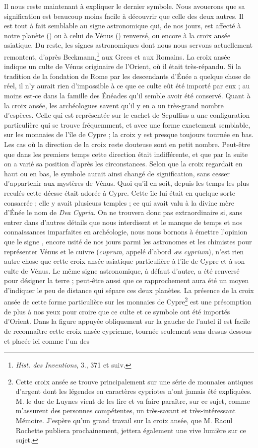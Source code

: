 \documentclass[a4paper, 11pt, oneside, polutonikogreek, french]{article}
\begin{document}
Il nous reste maintenant à expliquer le dernier symbole. Nous avouerons que sa signification est beaucoup moins facile à découvrir que celle des deux autres. Il est tout à fait semblable au signe astronomique qui, de nos jours, est affecté à notre planète (\earth) ou à celui de Vénus (\venus) renversé, ou encore à la croix ansée asiatique. Du reste, les signes astronomiques dont nous nous servons actuellement remontent, d'après Beckmann,\footnote{\emph{Hist. des Inventions}, 3., 371 et suiv.} aux Grecs et aux Romains. La croix ansée indique un culte de Vénus originaire de l'Orient, où il était très-répandu. Si la tradition de la fondation de Rome par les descendants d'Énée a quelque chose de réel, il n'y aurait rien d'impossible à ce que ce culte eût été importé par eux ; au moins est-ce dans la famille des Énéades qu'il semble avoir été conservé. Quant à la croix ansée, les archéologues savent qu'il y en a un très-grand nombre d'espèces. Celle qui est représentée sur le cachet de Sepullius a une configuration particulière qui se trouve fréquemment, et avec une forme exactement semblable, sur les monnaies de l'île de Cypre ; la croix y est presque toujours tournée en bas. Les cas où la direction de la croix reste douteuse sont en petit nombre. Peut-être que dans les premiers temps cette direction était indifférente, et que par la suite on a varié sa position d'après les circonstances. Selon que la croix regardait en haut ou en bas, le symbole aurait ainsi changé de signification, sans cesser d'appartenir aux mystères de Vénus. Quoi qu'il en soit, depuis les temps les plus reculés cette déesse était adorée à Cypre. Cette île lui était en quelque sorte consacrée ; elle y avait plusieurs temples ; ce qui avait valu à la divine mère d'Énée le nom de \emph{Dea Cypria}. On ne trouvera donc pas extraordinaire si, sans entrer dans d'autres détails que nous interdisent et le manque de temps et nos connaissances imparfaites en archéologie, nous nous bornons à émettre l'opinion que le signe \venus, encore usité de nos jours parmi les astronomes et les chimistes pour représenter Vénus et le cuivre (\emph{cuprum}, appelé d'abord \emph{æs cyprium}), n'est rien autre chose que cette croix ansée asiatique particulière à l'île de Cypre et à son culte de Vénus. Le même signe astronomique, à défaut d'autre, a été renversé pour désigner la terre ; peut-être aussi que ce rapprochement aura été un moyen d'indiquer le peu de distance qui sépare ces deux planètes. La présence de la croix ansée de cette forme particulière sur les monnaies de Cypre\footnote{Cette croix ansée se trouve principalement sur une série de monnaies antiques d'argent dont les légendes en caractères cypriotes n'ont jamais été expliquées. M. le duc de Luynes vient de les lire et va faire paraître, sur ce sujet, comme m'assurent des personnes compétentes, un très-savant et très-intéressant Mémoire. J'espère qu'un grand travail sur la croix ansée, que M. Raoul Rochette publiera prochainement, jettera également une vive lumière sur ce sujet.} est une présomption de plus à nos yeux pour croire que ce culte et ce symbole ont été importés d'Orient. Dans la figure appuyée obliquement sur la gauche de l'autel il est facile de reconnaître cette croix ansée cyprienne, tournée seulement sens dessus dessous et placée ici comme l'un des 
\end{document}
